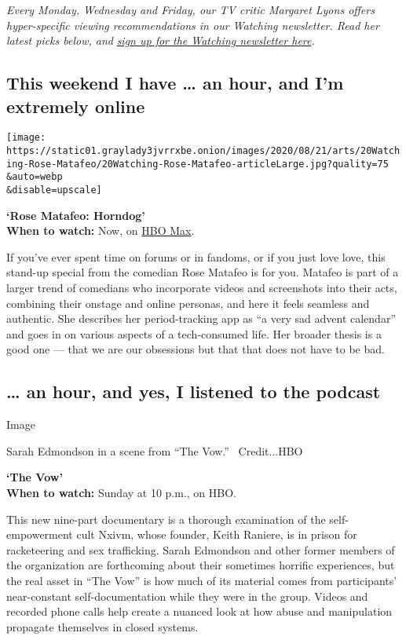 \emph{Every Monday, Wednesday and Friday, our TV critic Margaret Lyons
offers hyper-specific viewing recommendations in our Watching
newsletter. Read her latest picks below, and}
\href{https://www.nytimes3xbfgragh.onion/newsletters/watching}{\emph{sign
up for the Watching newsletter here}}\emph{.}

\hypertarget{this-weekend-i-have--an-hour-and-im-extremely-online}{%
\subsection{This weekend I have \ldots{} an hour, and I'm extremely
online}\label{this-weekend-i-have--an-hour-and-im-extremely-online}}

\texttt{[image: https://static01.graylady3jvrrxbe.onion/images/2020/08/21/arts/20Watching-Rose-Matafeo/20Watching-Rose-Matafeo-articleLarge.jpg?quality=75\\\&auto=webp\\\&disable=upscale]}

\textbf{`Rose Matafeo: Horndog'}\\
\textbf{When to watch:} Now, on
\href{https://play.hbomax.com/feature/urn:hbo:feature:GXwzPRAf5ncPDwgEAAAcY}{HBO
Max}.

If you've ever spent time on forums or in fandoms, or if you just love
love, this stand-up special from the comedian Rose Matafeo is for you.
Matafeo is part of a larger trend of comedians who incorporate videos
and screenshots into their acts, combining their onstage and online
personas, and here it feels seamless and authentic. She describes her
period-tracking app as ``a very sad advent calendar'' and goes in on
various aspects of a tech-consumed life. Her broader thesis is a good
one --- that we are our obsessions but that that does not have to be
bad.

\hypertarget{-an-hour-and-yes-i-listened-to-the-podcast}{%
\subsection{\ldots{} an hour, and yes, I listened to the
podcast}\label{-an-hour-and-yes-i-listened-to-the-podcast}}

Image

Sarah Edmondson in a scene from ``The Vow.'' ~Credit...HBO

\textbf{`The Vow'}\\
\textbf{When to watch:} Sunday at 10 p.m., on HBO.

This new nine-part documentary is a thorough examination of the
self-empowerment cult Nxivm, whose founder, Keith Raniere, is in prison
for racketeering and sex trafficking. Sarah Edmondson and other former
members of the organization are forthcoming about their sometimes
horrific experiences, but the real asset in ``The Vow'' is how much of
its material comes from participants' near-constant self-documentation
while they were in the group. Videos and recorded phone calls help
create a nuanced look at how abuse and manipulation propagate themselves
in closed systems.

